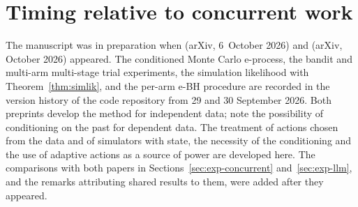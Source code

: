 \documentclass[11pt]{article}
\theoremstyle{remark}
\begin{document}
\section{Timing relative to concurrent work}\label{app:timeline}

The manuscript was in preparation when \citet{forre2026anytime} (arXiv,
6~October 2026) and \citet{cortinovis2026slice} (arXiv, October 2026)
appeared. The conditioned Monte Carlo e-process, the bandit and multi-arm
multi-stage trial experiments, the simulation likelihood with
Theorem~\ref{thm:simlik}, and the per-arm e-BH procedure are recorded in the
version history of the code repository from 29 and 30 September 2026. Both
preprints develop the method for independent data;
\citet[Appendix~C.1.1]{cortinovis2026slice} note the possibility of
conditioning on the past for dependent data. The treatment of actions chosen
from the data and of simulators with state, the necessity of the conditioning
and the use of adaptive actions as a source of power are developed here. The comparisons with both papers in
Sections~\ref{sec:exp-concurrent} and~\ref{sec:exp-llm}, and the remarks
attributing shared results to them, were added after they appeared.
\end{document}

